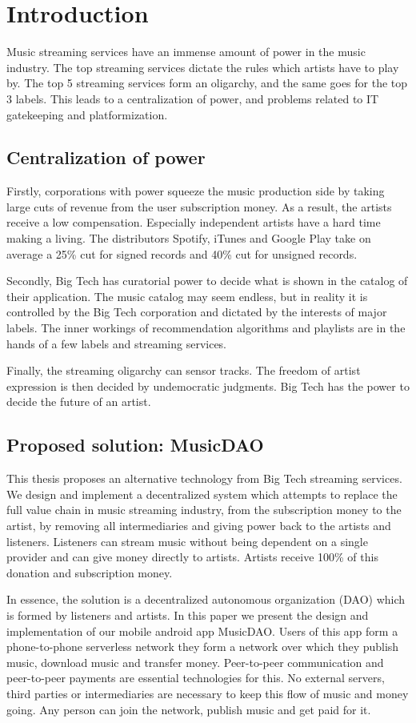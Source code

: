\chapter{Introduction}
\label{introduction}
Music streaming services have an immense amount of power in the music industry. The top streaming services dictate the rules which artists have to play by. The top 5 streaming services form an oligarchy, and the same goes for the top 3 labels. This leads to a centralization of power, and problems related to IT gatekeeping and platformization.

\section{Centralization of power}
Firstly, corporations with power squeeze the music production side by taking large cuts of revenue from the user subscription money. As a result, the artists receive a low compensation. Especially independent artists have a hard time making a living. The distributors Spotify, iTunes and Google Play take on average a 25\% cut for signed records and 40\% cut for unsigned records.

Secondly, Big Tech has curatorial power to decide what is shown in the catalog of their application. The music catalog may seem endless, but in reality it is controlled by the Big Tech corporation and dictated by the interests of major labels. The inner workings of recommendation algorithms and playlists are in the hands of a few labels and streaming services.

Finally, the streaming oligarchy can sensor tracks. The freedom of artist expression is then decided by undemocratic judgments. Big Tech has the power to decide the future of an artist.

\section{Proposed solution: MusicDAO}
This thesis proposes an alternative technology from Big Tech streaming services. We design and implement a decentralized system which attempts to replace the full value chain in music streaming industry, from the subscription money to the artist, by removing all intermediaries and giving power back to the artists and listeners. Listeners can stream music without being dependent on a single provider and can give money directly to artists. Artists receive 100\% of this donation and subscription money.

In essence, the solution is a decentralized autonomous organization (DAO) which is formed by listeners and artists. In this paper we present the design and implementation of our mobile android app MusicDAO. Users of this app form a phone-to-phone serverless network they form a network over which they publish music, download music and transfer money. Peer-to-peer communication and peer-to-peer payments are essential technologies for this. No external servers, third parties or intermediaries are necessary to keep this flow of music and money going. Any person can join the network, publish music and get paid for it. 

